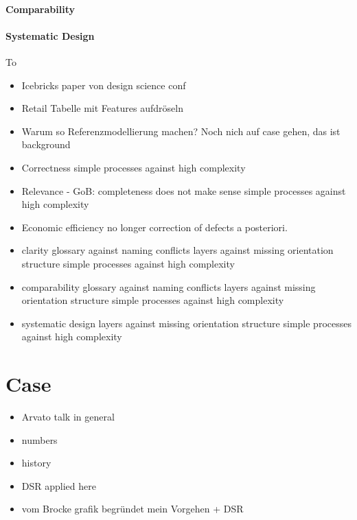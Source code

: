 	 \subsubsection{Comparability}
	 	
	 \subsubsection{Systematic Design}
	 To 
		\begin{itemize}
			\item Icebricks paper von design science conf
			\item Retail Tabelle mit Features aufdröseln 
			\item Warum so Referenzmodellierung machen? Noch nich auf case gehen, das ist background
		\end{itemize}
	
	\begin{itemize}
		\item Correctness
			\subitem simple processes against high complexity
		\item Relevance - GoB: completeness does not make sense
			\subitem simple processes against high complexity
		\item Economic efficiency
		\subitem no longer correction of defects a posteriori. 
		\item clarity
			\subitem glossary against naming conflicts
			 layers against missing orientation structure
			\subitem simple processes against high complexity
		\item comparability 
			\subitem glossary against naming conflicts
			 layers against missing orientation structure
			\subitem simple processes against high complexity
		\item systematic design 
			 layers against missing orientation structure
			\subitem simple processes against high complexity
	\end{itemize}
\chapter{Case}
\begin{itemize}
	\item Arvato talk in general
	\item numbers
	\item history
	\item DSR applied here
	\item vom Brocke grafik begründet mein Vorgehen + DSR
\end{itemize}
